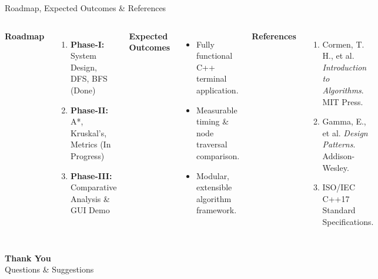 \documentclass[aspectratio=169,11pt]{beamer}
\begin{document}
\begin{frame}{Roadmap, Expected Outcomes \& References}
\begin{columns}[T,totalwidth=\textwidth]
\textbf{\color{GEUBlue}Roadmap}
\begin{enumerate}\itemsep3pt
\item \textbf{Phase-I:} System Design, DFS, BFS (Done)
\item \textbf{Phase-II:} A*, Kruskal's, Metrics (In Progress)
\item \textbf{Phase-III:} Comparative Analysis \& GUI Demo
\end{enumerate}
\textbf{\color{GEUBlue}Expected Outcomes}
\begin{itemize}\itemsep3pt
\item Fully functional C++ terminal application.
\item Measurable timing \& node traversal comparison.
\item Modular, extensible algorithm framework.
\end{itemize}
\textbf{\color{GEUBlue}References}
\begin{enumerate}\itemsep3pt
\item Cormen, T. H., et al. \textit{Introduction to Algorithms}. MIT Press.
\item Gamma, E., et al. \textit{Design Patterns}. Addison-Wesley.
\item ISO/IEC C++17 Standard Specifications.
\end{enumerate}
\end{columns}
\vfill
\begin{center}
\colorbox{GEUBlue}{\parbox{.50\textwidth}{\centering\color{white}\textbf{Thank You}\\Questions \& Suggestions}}
\end{center}
\end{frame}
\end{document}
